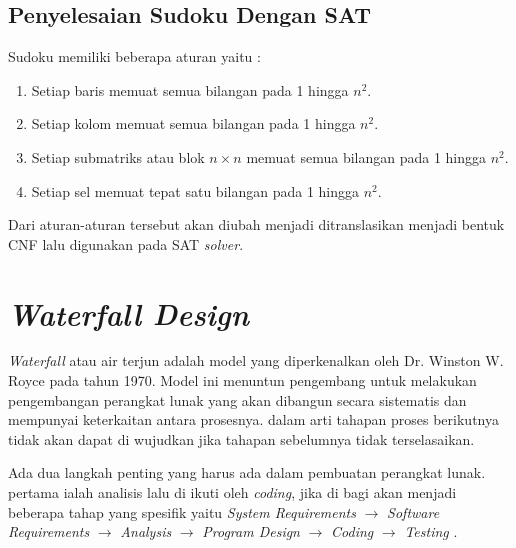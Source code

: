 \subsection{Penyelesaian Sudoku Dengan SAT}
Sudoku memiliki beberapa aturan yaitu :

\begin{enumerate}
	\item Setiap baris memuat semua bilangan pada 1 hingga $n^2$.
	\item Setiap kolom memuat semua bilangan pada 1 hingga $n^2$.
	\item Setiap submatriks atau blok $n \times n$
	 memuat semua bilangan pada 1 hingga $n^2$.
	\item Setiap sel memuat tepat satu bilangan pada 1 hingga $n^2$.
\end{enumerate}

Dari aturan-aturan tersebut akan diubah menjadi ditranslasikan menjadi bentuk CNF lalu digunakan pada SAT \textit{solver}.

\section{\textit{Waterfall Design}}

\textit{Waterfall} atau air terjun adalah model yang diperkenalkan oleh Dr.
Winston W. Royce pada tahun 1970. Model ini menuntun pengembang untuk
melakukan pengembangan perangkat lunak yang akan dibangun secara sistematis
dan mempunyai keterkaitan antara prosesnya. dalam arti tahapan proses
berikutnya tidak akan dapat di wujudkan jika tahapan sebelumnya tidak
terselasaikan.

Ada dua langkah penting yang harus ada dalam pembuatan perangkat lunak. pertama ialah analisis lalu di ikuti oleh \textit{coding}, jika di bagi akan menjadi beberapa tahap yang spesifik yaitu \textit{System
Requirements} $\to$ \textit{Software Requirements} $\to$ \textit{Analysis} $\to$ \textit{Program Design} $\to$ \textit{Coding} $\to$ \textit{Testing} \cite{royce1987managing}. 

